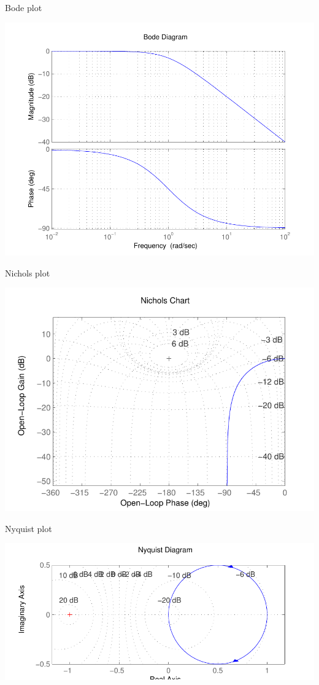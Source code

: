                 \begin{block}{Bode plot}
                  \begin{center}
                    \includegraphics[width=.8\linewidth]{imgs/fourier/bode_rc}
                  \end{center}
                \end{block}

            

                    \begin{block}{Nichols plot}
                  \begin{center}
                    \includegraphics[width=.8\linewidth]{imgs/fourier/nichols_rc}
                  \end{center}
                \end{block}

            

                    \begin{block}{Nyquist plot}
                  \begin{center}
                    \includegraphics[width=.8\linewidth]{imgs/fourier/nyquist_rc}
                  \end{center}
                \end{block}


